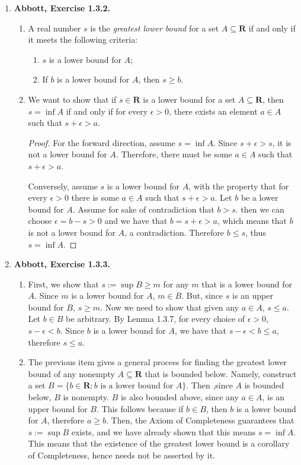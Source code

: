 \documentclass{article}
\newcommand{\R}{\mathbf{R}}
\newcommand{\exc}[2][Abbott]{\item \textbf{#1, Exercise #2.}}
\begin{document}
\begin{enumerate}
	\exc{1.3.2}
	\begin{enumerate}
		\item A real number $s$ is the \textit{greatest lower bound} for a set $A \subseteq \R$ if and only if it meets the following criteria:
		      \begin{enumerate}
		      	\item $s$ is a lower bound for $A$;
		      	\item If $b$ is a lower bound for $A$, then $s \geq b$.
		      \end{enumerate}
		\item We want to show that if $s \in \R$ is a lower bound for a set $A \subseteq \R$, then $s = \inf A$ if and only if for every $\epsilon > 0$, there exists an element $a \in A$ such that $s + \epsilon > a$.
		      \begin{proof}
		      	For the forward direction, assume $s = \inf A$. Since $s + \epsilon > s$, it is not a lower bound for $A$. Therefore, there must be some $a \in A$ such that $s + \epsilon > a$.
		      			      			      		      	      		      	      	    
		      	Conversely, assume $s$ is a lower bound for $A$, with the property that for every $\epsilon > 0$ there is some $a \in A$ such that $ s + \epsilon > a$. Let $b$ be a lower bound for $A$. Assume for sake of contradiction that $b > s$. then we can choose $\epsilon = b - s > 0$ and we have that $b = s + \epsilon > a$, which means that $b$ is not a lower bound for $A$, a contradiction. Therefore $b \leq s$, thus $s = \inf A$.
		      \end{proof}
	\end{enumerate}
				      	      
	\pagebreak
	\exc{1.3.3}
				      	      
	\begin{enumerate}
		\item First, we show that $s := \sup B \geq m$ for any $m$ that is a lower bound for $A$. Since $m$ is a lower bound for $A$, $m \in B$. But, since $s$ is an upper bound for $B$, $s \geq m$. Now we need to show that given any $a \in A$, $s \leq a$. Let $b \in B$ be arbitrary. By Lemma 1.3.7, for every choice of $\epsilon > 0$, $s-\epsilon < b$. Since $b$ is a lower bound for $A$, we have that $s-\epsilon < b \leq a$, therefore $s \leq a$. 
		      		      		      	      	      	      	          
		\item The previous item gives a general process for finding the greatest lower bound of any nonempty $A \subseteq \R$ that is bounded below. Namely, construct a set $B = \{b \in \R : b \text{ is a lower bound for }A\}$. Then ,since $A$ is bounded below, $B$ is nonempty. $B$ is also bounded above, since any $a \in A$, is an upper bound for $B$. This follows because if $b \in B$, then $b$ is a lower bound for $A$, therefore $a \geq b$. Then, the Axiom of Completeness guarantees that $s := \sup B$ exists, and we have already shown that this means $s = \inf A$. This means that the existence of the greatest lower bound is a corollary of Completeness, hence needs not be asserted by it.
		      		      		      	      	      	      	          

\end{enumerate}
\end{enumerate}
\end{document}
